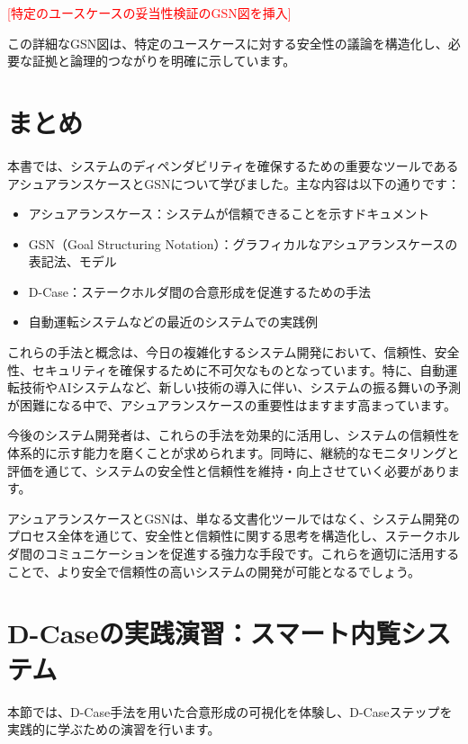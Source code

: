 \textcolor{red}{[特定のユースケースの妥当性検証のGSN図を挿入]}

この詳細なGSN図は、特定のユースケースに対する安全性の議論を構造化し、必要な証拠と論理的つながりを明確に示しています。

\section{まとめ}

本書では、システムのディペンダビリティを確保するための重要なツールであるアシュアランスケースとGSNについて学びました。主な内容は以下の通りです：

\begin{itemize}
    \item アシュアランスケース：システムが信頼できることを示すドキュメント
    \item GSN（Goal Structuring Notation）：グラフィカルなアシュアランスケースの表記法、モデル
    \item D-Case：ステークホルダ間の合意形成を促進するための手法
    \item 自動運転システムなどの最近のシステムでの実践例
\end{itemize}

これらの手法と概念は、今日の複雑化するシステム開発において、信頼性、安全性、セキュリティを確保するために不可欠なものとなっています。特に、自動運転技術やAIシステムなど、新しい技術の導入に伴い、システムの振る舞いの予測が困難になる中で、アシュアランスケースの重要性はますます高まっています。

今後のシステム開発者は、これらの手法を効果的に活用し、システムの信頼性を体系的に示す能力を磨くことが求められます。同時に、継続的なモニタリングと評価を通じて、システムの安全性と信頼性を維持・向上させていく必要があります。

アシュアランスケースとGSNは、単なる文書化ツールではなく、システム開発のプロセス全体を通じて、安全性と信頼性に関する思考を構造化し、ステークホルダ間のコミュニケーションを促進する強力な手段です。これらを適切に活用することで、より安全で信頼性の高いシステムの開発が可能となるでしょう。

\section{D-Caseの実践演習：スマート内覧システム}

本節では、D-Case手法を用いた合意形成の可視化を体験し、D-Caseステップを実践的に学ぶための演習を行います。

